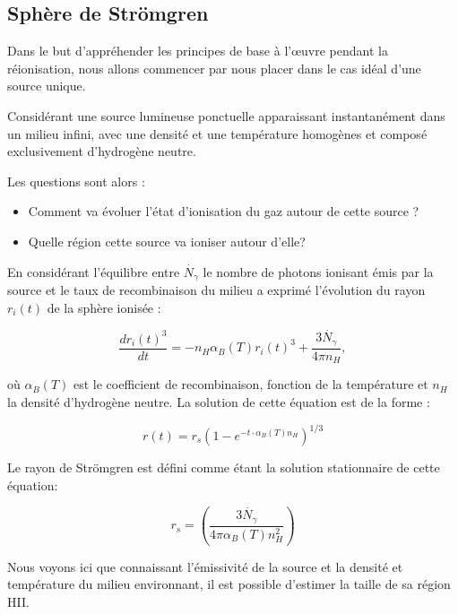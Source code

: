 \subsection{Sphère de Strömgren}
\label{sec:stromgren}

Dans le but d’appréhender les principes de base à l’œuvre pendant la réionisation, nous allons commencer par nous placer dans le cas idéal d'une source unique.

Considérant une source lumineuse ponctuelle apparaissant instantanément dans un milieu infini, avec une densité et une température homogènes et composé exclusivement d’hydrogène neutre.

Les questions sont alors : 
\begin{itemize}
\item Comment va évoluer l’état d'ionisation du gaz autour de cette source ?
\item Quelle région cette source va ioniser autour d'elle?
\end{itemize}

En considérant l'équilibre entre $\dot{N_\gamma}$ le nombre de photons ionisant émis par la source et le taux de recombinaison du milieu \cite{stromgren_physical_1939} a exprimé l'évolution du rayon  $r_i(t)$ de la sphère ionisée :

\begin{equation}
\frac{dr_i(t)^3}{dt} = -n_H \alpha_B(T)r_i (t)^3 + \frac{3 \dot{N_\gamma} }{4 \pi n_H},
\end{equation}

où $\alpha_B(T)$ est le coefficient de recombinaison, fonction de la température et $n_H$ la densité d'hydrogène neutre.
La solution de cette équation est de la forme :

\begin{equation}
r(t) = r_s \left( 1 - e^{-t\cdot \alpha_B(T) n_H } \right)^{1/3}
\end{equation}

%

Le rayon de Strömgren est défini comme étant la solution stationnaire de cette équation:

\begin{equation}
r_s = \left( \frac{3 \dot{N_\gamma} }{4 \pi \alpha_B(T) n_H^2} \right)
\end{equation}

Nous voyons ici que connaissant l'émissivité de la source et la densité et température du milieu environnant, il est possible d'estimer la taille de sa région HII.

